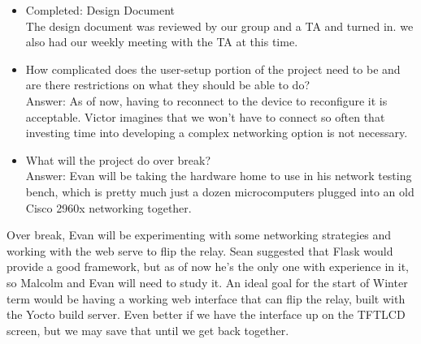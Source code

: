 \documentclass[letterpaper,10pt]{article}
\begin{document}
\begin{itemize}
    \item Completed: Design Document\\
        The design document was reviewed by our group and a TA and turned in.
        we also had our weekly meeting with the TA at this time.  
    \item How complicated does the user-setup portion of the project need to be
        and are there restrictions on what they should be able to do?\\
        Answer: As of now, having to reconnect to the device to reconfigure it
        is acceptable. Victor imagines that we won't have to connect so often
        that investing time into developing a complex networking option is not
        necessary.
    \item What will the project do over break?\\
        Answer: Evan will be taking the hardware home to use in his network
        testing bench, which is pretty much just a dozen microcomputers plugged
        into an old Cisco 2960x networking together. 
\end{itemize}

Over break, Evan will be experimenting with some networking strategies and
working with the web serve to flip the relay. Sean suggested that Flask would
provide a good framework, but as of now he's the only one with experience in
it, so Malcolm and Evan will need to study it. An ideal goal for the start of
Winter term would be having a working web interface that can flip the relay,
built with the Yocto build server. Even better if we have the interface up on
the TFTLCD screen, but we may save that until we get back together.
\end{document}
